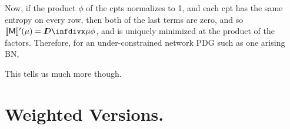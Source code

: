 \documentclass{article}
\newcommand{\sfM}{\mathsf M}
\begin{document}
	Now, if the product $\phi$ of the cpts normalizes to 1, and each cpt has the same entropy on every row, then both of the last terms are zero, and so $\bbr{\sfM}'(\mu) = \kldiv{\mu}{\phi}$, and is uniquely minimized at the product of the factors. Therefore, for an under-constrained network PDG such as one arising BN, 
	
	This tells us much more though.
	
	
	\section{Weighted Versions.}
	
\end{document}
